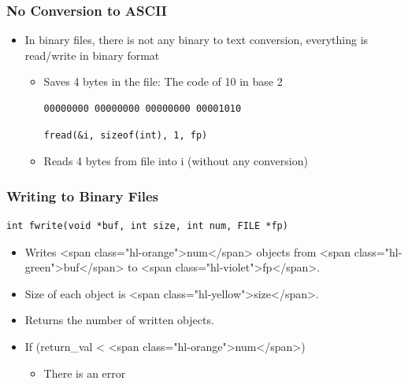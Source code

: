 \documentclass{../c-lecture}
\begin{document}
\begin{frame}[fragile]
  \frametitle{No Conversion to ASCII}
  \begin{itemize}
    \item
      In binary files, there is not any binary to text conversion, everything
      is read/write in binary format

    \begin{itemize}
      \begin{verbatim}
int i = 10;
fwrite(&i, sizeof(int), 1, fp)
      \end{verbatim}
      \item Saves 4 bytes in the file: The code of 10 in base 2
      \begin{verbatim}
00000000 00000000 00000000 00001010
      \end{verbatim}
      \begin{verbatim}
fread(&i, sizeof(int), 1, fp)
      \end{verbatim}
      \item Reads 4 bytes from file into i (without any conversion)
    \end{itemize}
  \end{itemize}
\end{frame}

\begin{frame}[fragile]
  \frametitle{Writing to Binary Files}
  \begin{verbatim}
int fwrite(void *buf, int size, int num, FILE *fp)
  \end{verbatim}
  \begin{itemize}
    \item
      Writes <span class="hl-orange">num</span> objects from
      <span class="hl-green">buf</span> to <span class="hl-violet">fp</span>.

    \item Size of each object is <span class="hl-yellow">size</span>.
    \item Returns the number of written objects.
    \item If (return\_val < <span class="hl-orange">num</span>)
    \begin{itemize}
      \item There is an error
    \end{itemize}
  \end{itemize}
\end{frame}
\end{document}
